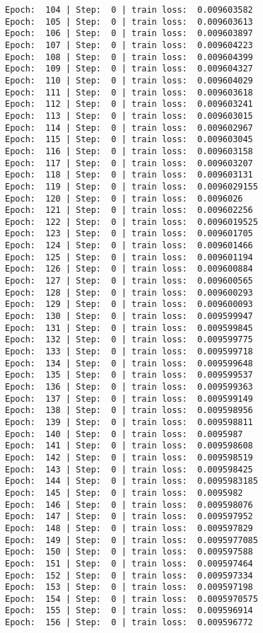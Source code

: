 \documentclass[11pt]{article}
\begin{document}
\begin{Verbatim}[commandchars=\\\{\}]
Epoch:  104 | Step:  0 | train loss:  0.009603582
Epoch:  105 | Step:  0 | train loss:  0.009603613
Epoch:  106 | Step:  0 | train loss:  0.009603897
Epoch:  107 | Step:  0 | train loss:  0.009604223
Epoch:  108 | Step:  0 | train loss:  0.009604399
Epoch:  109 | Step:  0 | train loss:  0.009604327
Epoch:  110 | Step:  0 | train loss:  0.009604029
Epoch:  111 | Step:  0 | train loss:  0.009603618
Epoch:  112 | Step:  0 | train loss:  0.009603241
Epoch:  113 | Step:  0 | train loss:  0.009603015
Epoch:  114 | Step:  0 | train loss:  0.009602967
Epoch:  115 | Step:  0 | train loss:  0.009603045
Epoch:  116 | Step:  0 | train loss:  0.009603158
Epoch:  117 | Step:  0 | train loss:  0.009603207
Epoch:  118 | Step:  0 | train loss:  0.009603131
Epoch:  119 | Step:  0 | train loss:  0.0096029155
Epoch:  120 | Step:  0 | train loss:  0.0096026
Epoch:  121 | Step:  0 | train loss:  0.009602256
Epoch:  122 | Step:  0 | train loss:  0.0096019525
Epoch:  123 | Step:  0 | train loss:  0.009601705
Epoch:  124 | Step:  0 | train loss:  0.009601466
Epoch:  125 | Step:  0 | train loss:  0.009601194
Epoch:  126 | Step:  0 | train loss:  0.009600884
Epoch:  127 | Step:  0 | train loss:  0.009600565
Epoch:  128 | Step:  0 | train loss:  0.009600293
Epoch:  129 | Step:  0 | train loss:  0.009600093
Epoch:  130 | Step:  0 | train loss:  0.009599947
Epoch:  131 | Step:  0 | train loss:  0.009599845
Epoch:  132 | Step:  0 | train loss:  0.009599775
Epoch:  133 | Step:  0 | train loss:  0.009599718
Epoch:  134 | Step:  0 | train loss:  0.009599648
Epoch:  135 | Step:  0 | train loss:  0.009599537
Epoch:  136 | Step:  0 | train loss:  0.009599363
Epoch:  137 | Step:  0 | train loss:  0.009599149
Epoch:  138 | Step:  0 | train loss:  0.009598956
Epoch:  139 | Step:  0 | train loss:  0.009598811
Epoch:  140 | Step:  0 | train loss:  0.0095987
Epoch:  141 | Step:  0 | train loss:  0.009598608
Epoch:  142 | Step:  0 | train loss:  0.009598519
Epoch:  143 | Step:  0 | train loss:  0.009598425
Epoch:  144 | Step:  0 | train loss:  0.0095983185
Epoch:  145 | Step:  0 | train loss:  0.0095982
Epoch:  146 | Step:  0 | train loss:  0.009598076
Epoch:  147 | Step:  0 | train loss:  0.009597952
Epoch:  148 | Step:  0 | train loss:  0.009597829
Epoch:  149 | Step:  0 | train loss:  0.0095977085
Epoch:  150 | Step:  0 | train loss:  0.009597588
Epoch:  151 | Step:  0 | train loss:  0.009597464
Epoch:  152 | Step:  0 | train loss:  0.009597334
Epoch:  153 | Step:  0 | train loss:  0.009597198
Epoch:  154 | Step:  0 | train loss:  0.0095970575
Epoch:  155 | Step:  0 | train loss:  0.009596914
Epoch:  156 | Step:  0 | train loss:  0.009596772

\end{Verbatim}
\end{document}
